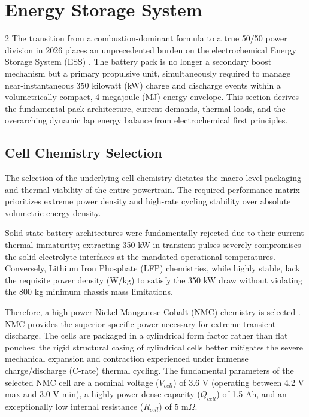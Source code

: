 \section{Energy Storage System}

\begin{multicols}{2}
The transition from a combustion-dominant formula to a true 50/50 power division in 2026 places an unprecedented burden on the electrochemical Energy Storage System (ESS) \cite{FIA_2026_PU_Regulations}. The battery pack is no longer a secondary boost mechanism but a primary propulsive unit, simultaneously required to manage near-instantaneous 350 kilowatt (kW) charge and discharge events within a volumetrically compact, 4 megajoule (MJ) energy envelope. This section derives the fundamental pack architecture, current demands, thermal loads, and the overarching dynamic lap energy balance from electrochemical first principles.

\subsection{Cell Chemistry Selection}

The selection of the underlying cell chemistry dictates the macro-level packaging and thermal viability of the entire powertrain. The required performance matrix prioritizes extreme power density and high-rate cycling stability over absolute volumetric energy density. 

Solid-state battery architectures were fundamentally rejected due to their current thermal immaturity; extracting 350 kW in transient pulses severely compromises the solid electrolyte interfaces at the mandated operational temperatures. Conversely, Lithium Iron Phosphate (LFP) chemistries, while highly stable, lack the requisite power density (W/kg) to satisfy the 350 kW draw without violating the 800 kg minimum chassis mass limitations. 

Therefore, a high-power Nickel Manganese Cobalt (NMC) chemistry is selected \cite{nmc_chemistry_lit}. NMC provides the superior specific power necessary for extreme transient discharge. The cells are packaged in a cylindrical form factor rather than flat pouches; the rigid structural casing of cylindrical cells better mitigates the severe mechanical expansion and contraction experienced under immense charge/discharge (C-rate) thermal cycling. The fundamental parameters of the selected NMC cell are a nominal voltage ($V_{cell}$) of 3.6 V (operating between 4.2 V max and 3.0 V min), a highly power-dense capacity ($Q_{cell}$) of 1.5 Ah, and an exceptionally low internal resistance ($R_{cell}$) of 5 m$\Omega$.


\end{multicols}

